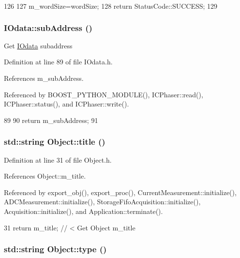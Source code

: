 \begin{DoxyCode}
126                                                  {
127     m_wordSize=wordSize;
128     return StatusCode::SUCCESS;
129   }
\end{DoxyCode}
\hypertarget{classIOdata_a25df48b84364a468373260f823ed9c5f}{
\subsubsection[{subAddress}]{ IOdata::subAddress ()}}
\label{classIOdata_a25df48b84364a468373260f823ed9c5f}
Get \hyperlink{classIOdata}{IOdata} subaddress 

Definition at line 89 of file IOdata.h.

References m\_\-subAddress.

Referenced by BOOST\_\-PYTHON\_\-MODULE(), ICPhaser::read(), ICPhaser::status(), and ICPhaser::write().


\begin{DoxyCode}
89                   {
90     return m_subAddress;
91   }
\end{DoxyCode}
\hypertarget{classObject_a73a0f1a41828fdd8303dd662446fb6c3}{
\subsubsection[{title}]{\setlength{\rightskip}{0pt plus 5cm}std::string Object::title ()}}
\label{classObject_a73a0f1a41828fdd8303dd662446fb6c3}


Definition at line 31 of file Object.h.

References Object::m\_\-title.

Referenced by export\_\-obj(), export\_\-proc(), CurrentMeasurement::initialize(), ADCMeasurement::initialize(), StorageFifoAcquisition::initialize(), Acquisition::initialize(), and Application::terminate().


\begin{DoxyCode}
31 { return m_title;      } // < Get Object m_title
\end{DoxyCode}
\hypertarget{classObject_a84f99f70f144a83e1582d1d0f84e4e62}{
\subsubsection[{type}]{\setlength{\rightskip}{0pt plus 5cm}std::string Object::type ()}}
\label{classObject_a84f99f70f144a83e1582d1d0f84e4e62}


